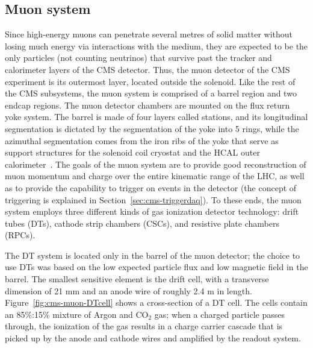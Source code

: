 \subsection{Muon system\label{sec:cms-muon}}
Since high-energy muons can penetrate several metres of solid matter without losing much energy via interactions with the medium, they are expected to be the only particles (not counting neutrinos) that survive past the tracker and calorimeter layers of the CMS detector. Thus, the muon detector of the CMS experiment is its outermost layer, located outside the solenoid. Like the rest of the CMS subsystems, the muon system is comprised of a barrel region and two endcap regions. The muon detector chambers are mounted on the flux return yoke system. The barrel is made of four layers called stations, and its longitudinal segmentation is dictated by the segmentation of the yoke into 5 rings, while the azimuthal segmentation comes from the iron ribs of the yoke that serve as support structures for the solenoid coil cryostat and the HCAL outer calorimeter~\cite{MuonTDR}. The goals of the muon system are to provide good reconstruction of muon momentum and charge over the entire kinematic range of the LHC, as well as to provide the capability to trigger on events in the detector (the concept of triggering is explained in Section~\ref{sec:cms-triggerdaq}). To these ends, the muon system employs three different kinds of gas ionization detector technology: drift tubes (DTs), cathode strip chambers (CSCs), and resistive plate chambers (RPCs).

The DT system is located only in the barrel of the muon detector; the choice to use DTs was based on the low expected particle flux and low magnetic field in the barrel. The smallest sensitive element is the drift cell, with a transverse dimension of 21 mm and an anode wire of roughly 2.4 m in length. Figure~\ref{fig:cms-muon-DTcell} shows a cross-section of a DT cell. The cells contain an 85\%:15\% mixture of Argon and CO$_2$ gas; when a charged particle passes through, the ionization of the gas results in a charge carrier cascade that is picked up by the anode and cathode wires and amplified by the readout system.

